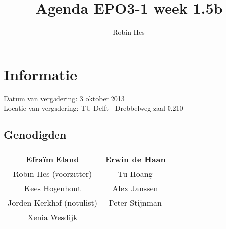 \documentclass{article}
\begin{document}
\title{Agenda EPO3-1 week 1.5b}%
\author{Robin Hes}%
\maketitle

\section*{Informatie}
Datum van vergadering: 3 oktober 2013\\ %
Locatie van vergadering: TU Delft - Drebbelweg zaal 0.210 %
\subsection*{Genodigden}
\begin{center}
\begin{tabular}{|c |c |}
	\hline
	Efraïm Eland & Erwin de Haan \\
	\hline
	Robin Hes (voorzitter) & Tu Hoang \\
	\hline
	Kees Hogenhout & Alex Janssen \\
	\hline
	Jorden Kerkhof (notulist) & Peter Stijnman \\
	\hline
	Xenia Wesdijk & \\
	\hline
\end{tabular}
\end{center}
\end{document}

